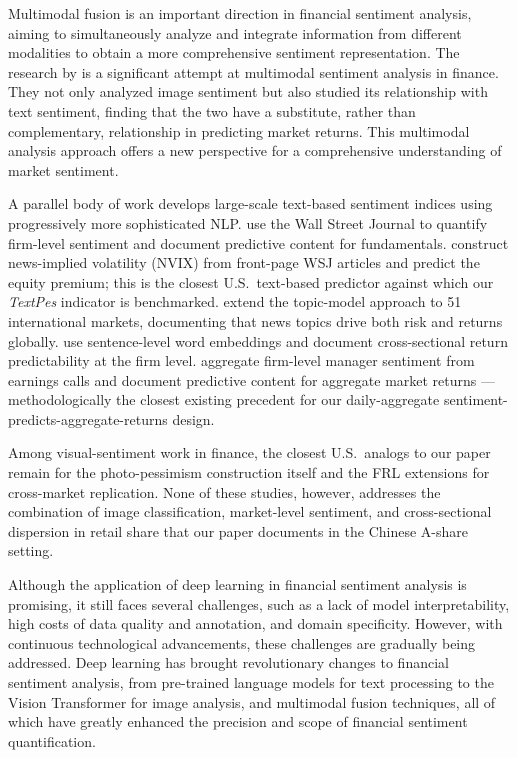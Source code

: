 \documentclass[AER]{AEA}
\begin{document}
Multimodal fusion is an important direction in financial sentiment analysis, aiming to simultaneously analyze and integrate information from different modalities to obtain a more comprehensive sentiment representation. The research by \citet{obaid2022picture} is a significant attempt at multimodal sentiment analysis in finance. They not only analyzed image sentiment but also studied its relationship with text sentiment, finding that the two have a substitute, rather than complementary, relationship in predicting market returns. This multimodal analysis approach offers a new perspective for a comprehensive understanding of market sentiment.

A parallel body of work develops large-scale text-based sentiment indices using progressively more sophisticated NLP. \citet{tetlock2008giving} use the Wall Street Journal to quantify firm-level sentiment and document predictive content for fundamentals. \citet{manela2017news} construct news-implied volatility (NVIX) from front-page WSJ articles and predict the equity premium; this is the closest U.S.\ text-based predictor against which our \textit{TextPes} indicator is benchmarked. \citet{calomiris2019news} extend the topic-model approach to 51 international markets, documenting that news topics drive both risk and returns globally. \citet{ke2019predicting} use sentence-level word embeddings and document cross-sectional return predictability at the firm level. \citet{jiang2021manager} aggregate firm-level manager sentiment from earnings calls and document predictive content for aggregate market returns --- methodologically the closest existing precedent for our daily-aggregate sentiment-predicts-aggregate-returns design.

Among visual-sentiment work in finance, the closest U.S.\ analogs to our paper remain \citet{obaid2022picture} for the photo-pessimism construction itself and the FRL extensions \citep{frl2022photo37,frl2023crypto,frl2025sustainable} for cross-market replication. None of these studies, however, addresses the combination of image classification, market-level sentiment, and cross-sectional dispersion in retail share that our paper documents in the Chinese A-share setting.

Although the application of deep learning in financial sentiment analysis is promising, it still faces several challenges, such as a lack of model interpretability, high costs of data quality and annotation, and domain specificity. However, with continuous technological advancements, these challenges are gradually being addressed. Deep learning has brought revolutionary changes to financial sentiment analysis, from pre-trained language models for text processing to the Vision Transformer for image analysis, and multimodal fusion techniques, all of which have greatly enhanced the precision and scope of financial sentiment quantification.
\end{document}
